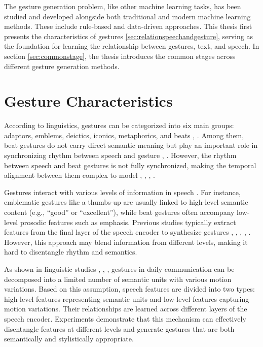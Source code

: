 The gesture generation problem, like other machine learning tasks, has been studied and developed alongside both traditional and modern machine learning methods. These include rule-based and data-driven approaches. This thesis first presents the characteristics of gestures \autoref{sec:relationspeechandgesture}, serving as the foundation for learning the relationship between gestures, text, and speech. In section \autoref{sec:commonstage}, the thesis introduces the common stages across different gesture generation methods.


\section{Gesture Characteristics}
\label{sec:relationspeechandgesture}

According to linguistics, gestures can be categorized into six main groups: adaptors, emblems, deictics, iconics, metaphorics, and beats \cite{ekman1969repertoire}, \cite{sebeok2011advances}. Among them, beat gestures do not carry direct semantic meaning but play an important role in synchronizing rhythm between speech and gesture \cite{kipp2005gesture}, \cite{sebeok2011advances}. However, the rhythm between speech and beat gestures is not fully synchronized, making the temporal alignment between them complex to model \cite{mcclave1994gestural}, \cite{bhattacharya2021speech2affectivegestures}, \cite{kucherenko2020gesticulator}, \cite{yoon2020speech}.

Gestures interact with various levels of information in speech \cite{sebeok2011advances}. For instance, emblematic gestures like a thumbs-up are usually linked to high-level semantic content (e.g., “good” or “excellent”), while beat gestures often accompany low-level prosodic features such as emphasis. Previous studies typically extract features from the final layer of the speech encoder to synthesize gestures \cite{alexanderson2020style}, \cite{bhattacharya2021speech2affectivegestures}, \cite{kucherenko2021large}, \cite{qian2021speech}, \cite{yoon2022genea}. However, this approach may blend information from different levels, making it hard to disentangle rhythm and semantics.

As shown in linguistic studies \cite{kipp2005gesture}, \cite{neff2008gesture}, \cite{webb1997linguistic}, gestures in daily communication can be decomposed into a limited number of semantic units with various motion variations. Based on this assumption, speech features are divided into two types: high-level features representing semantic units and low-level features capturing motion variations. Their relationships are learned across different layers of the speech encoder. Experiments demonstrate that this mechanism can effectively disentangle features at different levels and generate gestures that are both semantically and stylistically appropriate.

